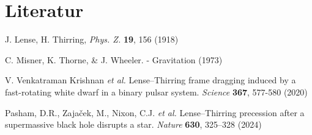 \documentclass[12pt,a4paper]{article}
\begin{document}
	\section*{Literatur}
	\begin{enumerate}[label={[\arabic*]}]
		\item J. Lense, H. Thirring, \textit{Phys. Z.} \textbf{19}, 156 (1918)
		\item C. Misner, K. Thorne, \& J. Wheeler. - Gravitation (1973)
		\item V. Venkatraman Krishnan \textit{et al.} Lense–Thirring frame dragging induced by a fast-rotating white dwarf in a binary pulsar system. \textit{Science} \textbf{367}, 577-580 (2020)
		\item Pasham, D.R., Zajaček, M., Nixon, C.J. \textit{et al.} Lense–Thirring precession after a supermassive black hole disrupts a star. \textit{Nature} \textbf{630}, 325–328 (2024)
	\end{enumerate}
	
	\thispagestyle{empty}
	
\end{document}
